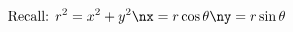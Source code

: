 \documentclass[preview]{standalone}
\begin{document}
\begin{align*}
\text{Recall: }r^2=x^2+y^2\nx=r\cos\theta\ny=r\sin\theta
\end{align*}
\end{document}
